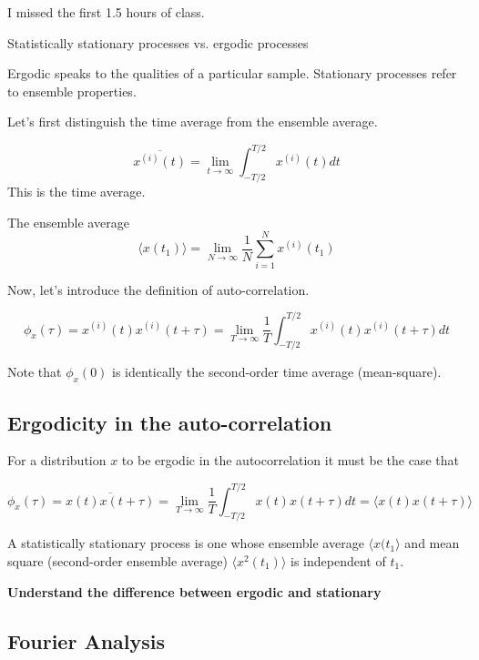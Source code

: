 \documentclass{article}
\begin{document}
I missed the first 1.5 hours of class.

Statistically stationary processes vs. ergodic processes

Ergodic speaks to the qualities of a particular sample. Stationary processes
refer to ensemble properties.

Let's first distinguish the time average from the ensemble average.

\begin{equation}
   \overline{x^{(i)}(t)} = \lim_{t \rightarrow \infty} \int_{-T/2}^{T/2}
   x^{(i)}(t) dt
\end{equation}
This is the time average.

The ensemble average
\begin{equation}
   \langle x(t_1) \rangle = \lim_{N \rightarrow \infty}\frac{1}{N} \sum_{i=1}^N
   x^{(i)}(t_1)
\end{equation}

Now, let's introduce the definition of auto-correlation.

\[
   \phi_{x}(\tau) = x^{(i)}(t) x^{(i)}(t+\tau) = \lim_{T \rightarrow \infty}
   \frac{1}{T} \int_{-T/2}^{T/2} x^{(i)}(t) x^{(i)}(t+\tau) dt
\]

Note that $ \phi_{x}(0) $ is identically the second-order time average
(mean-square).

\subsection{Ergodicity in the auto-correlation}
\label{sub:ergodicity_in_the_auto_correlation}

For a distribution  $ x $ to be ergodic in the autocorrelation it must be the
case that

\[
   \phi_{x}(\tau) = \overline{x(t)x(t+\tau)} = \lim_{T \rightarrow \infty}
   \frac{1}{T}\int_{-T/2}^{T/2} x(t) x(t+\tau) dt = \langle x(t)x(t+\tau) \rangle
\]

A statistically stationary process is one whose ensemble average  $ \langle
   x(t_{1} \rangle $ and mean square (second-order ensemble average) $ \langle
   x^{2}(t_1) \rangle $ is independent of  $ t_1 $.

   \textbf{Understand the difference between ergodic and stationary}

   \subsection{Fourier Analysis}
   \label{sub:fourier_analysis}
\end{document}
